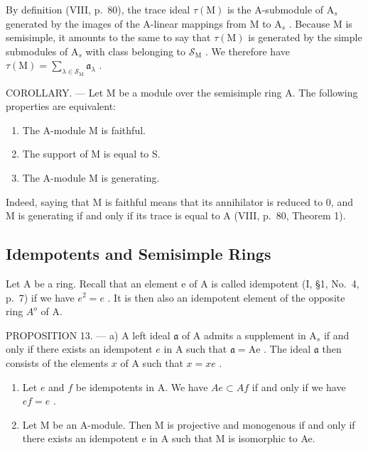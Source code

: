 By definition (VIII, p.~80), the trace ideal \(\tau(\mathrm{M})\) is the A-submodule of \(\mathrm{A}_s\) generated by the images of the A-linear mappings from M to \(\mathrm{A}_s\) . Because M is semisimple, it amounts to the same to say that \(\tau(\mathrm{M})\) is generated by the simple submodules of \(\mathrm{A}_s\) with class belonging to \(\mathcal{S}_{\mathrm{M}}\) . We therefore have \(\tau(\mathrm{M}) = \sum_{\lambda \in \mathcal{S}_{\mathrm{M}}} \mathfrak{a}_{\lambda}\) .

COROLLARY. --- Let M be a module over the semisimple ring A. The following properties are equivalent:

\begin{enumerate}
\def\labelenumi{(\roman{enumi})}
\item
  The A-module M is faithful.
\item
  The support of M is equal to S.
\item
  The A-module M is generating.
\end{enumerate}

Indeed, saying that M is faithful means that its annihilator is reduced to 0, and M is generating if and only if its trace is equal to A (VIII, p.~80, Theorem 1).

\subsection{Idempotents and Semisimple Rings}

Let A be a ring. Recall that an element e of A is called idempotent (I, §1, No.~4, p.~7) if we have \(e^{2} = e\) . It is then also an idempotent element of the opposite ring \(A^{o}\) of A.

PROPOSITION 13. --- a) A left ideal \(\mathfrak{a}\) of A admits a supplement in \(\mathrm{A}_s\) if and only if there exists an idempotent \(e\) in A such that \(\mathfrak{a} = \mathrm{Ae}\) . The ideal \(\mathfrak{a}\) then consists of the elements \(x\) of A such that \(x = xe\) .

\begin{enumerate}
\def\labelenumi{\alph{enumi})}
\setcounter{enumi}{1}
\item
  Let \(e\) and \(f\) be idempotents in A. We have \(Ae \subset Af\) if and only if we have \(ef = e\) .
\item
  Let M be an A-module. Then M is projective and monogenous if and only if there exists an idempotent e in A such that M is isomorphic to Ae.
\end{enumerate}

